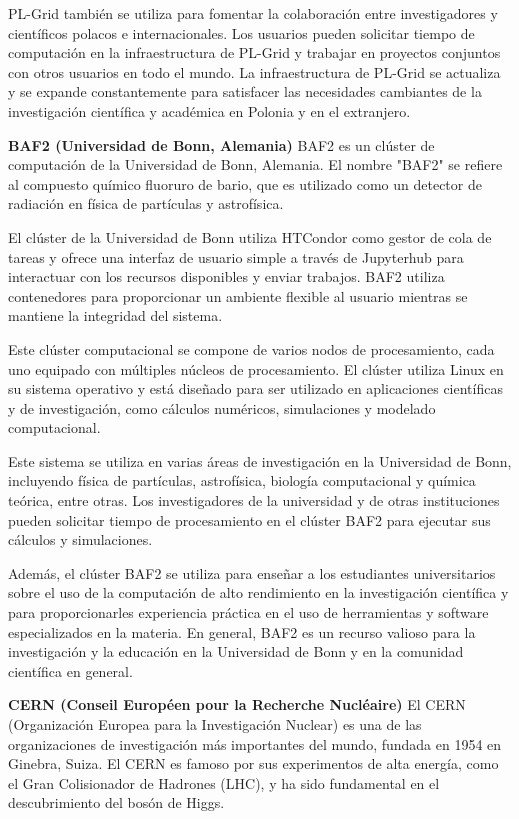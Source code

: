 \begin{doublespace}
\begin{multicols}{2}
  PL-Grid también se utiliza para fomentar la colaboración entre investigadores y científicos polacos e internacionales. Los usuarios pueden solicitar tiempo de computación en la infraestructura de PL-Grid y trabajar en proyectos conjuntos con otros usuarios en todo el mundo. La infraestructura de PL-Grid se actualiza y se expande constantemente para satisfacer las necesidades cambiantes de la investigación científica y académica en Polonia y en el extranjero.
  
  \vspace{2mm}

  \textbf{BAF2 (Universidad de Bonn, Alemania)}
  \newline
  BAF2 es un clúster de computación de la Universidad de Bonn, Alemania. El nombre "BAF2" se refiere al compuesto químico fluoruro de bario, que es utilizado como un detector de radiación en física de partículas y astrofísica.
  
  El clúster de la Universidad de Bonn utiliza HTCondor como gestor de cola de tareas y ofrece una interfaz de usuario simple a través de Jupyterhub para interactuar con los recursos disponibles y enviar trabajos. BAF2 utiliza contenedores para proporcionar un ambiente flexible al usuario mientras se mantiene la integridad del sistema.

  Este clúster computacional se compone de varios nodos de procesamiento, cada uno equipado con múltiples núcleos de procesamiento. El clúster utiliza Linux en su sistema operativo y está diseñado para ser utilizado en aplicaciones científicas y de investigación, como cálculos numéricos, simulaciones y modelado computacional.

  Este sistema se utiliza en varias áreas de investigación en la Universidad de Bonn, incluyendo física de partículas, astrofísica, biología computacional y química teórica, entre otras. Los investigadores de la universidad y de otras instituciones pueden solicitar tiempo de procesamiento en el clúster BAF2 para ejecutar sus cálculos y simulaciones.

    Además, el clúster BAF2 se utiliza para enseñar a los estudiantes universitarios sobre el uso de la computación de alto rendimiento en la investigación científica y para proporcionarles experiencia práctica en el uso de herramientas y software especializados en la materia. En general, BAF2 es un recurso valioso para la investigación y la educación en la Universidad de Bonn y en la comunidad científica en general.

  \textbf{CERN (Conseil Européen pour la Recherche Nucléaire)}
  \newline
  El CERN (Organización Europea para la Investigación Nuclear) es una de las organizaciones de investigación más importantes del mundo, fundada en 1954 en Ginebra, Suiza. El CERN es famoso por sus experimentos de alta energía, como el Gran Colisionador de Hadrones (LHC), y ha sido fundamental en el descubrimiento del bosón de Higgs.


\end{multicols}
\end{doublespace}
